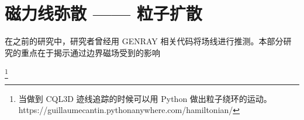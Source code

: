 \chapter{磁力线弥散 —— 粒子扩散}


在之前的研究中，研究者曾经用 GENRAY 相关代码将场线进行推测。本部分研究的重点在于揭示通过边界磁场受到的影响


\footnote{
当做到 CQL3D 迹线追踪的时候可以用 Python 做出粒子绕环的运动。
https://guillaumecantin.pythonanywhere.com/hamiltonian/}
